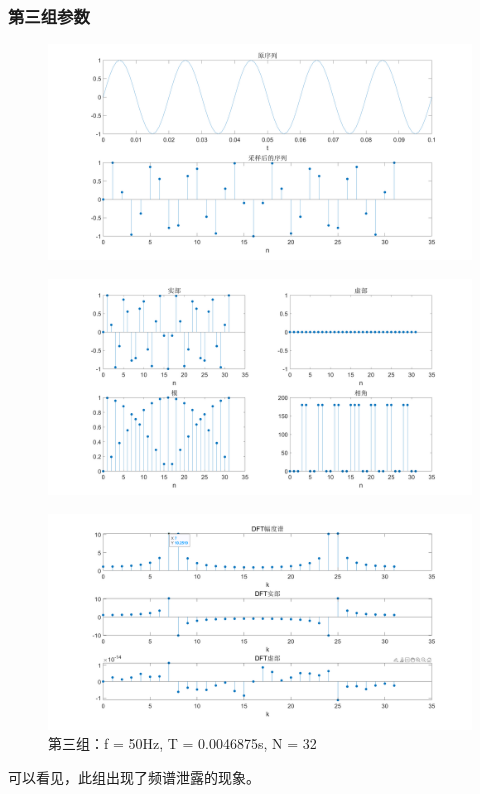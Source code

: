 \documentclass{../source/Experiment copy}
\begin{document}
\subsubsection{第三组参数}
\begin{figure}[H]
    \centering
    \includegraphics[width = \textwidth]{src/exp2_3_1.png}
\end{figure}

\begin{figure}[H]
    \centering
    \includegraphics[width = \textwidth]{src/exp2_3_2.png}
\end{figure}

\begin{figure}[H]
    \centering
    \includegraphics[width = \textwidth]{src/exp2_3_3.png}
    \caption{第三组：f = 50Hz, T = 0.0046875s, N = 32}
\end{figure}
可以看见，此组出现了频谱泄露的现象。
\end{document}
